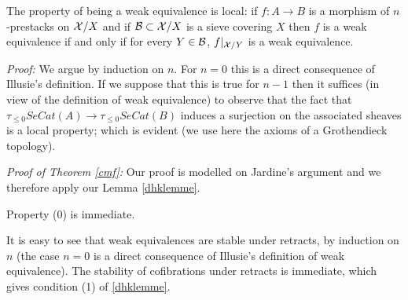 \begin{lemma}
\label{locale}
The property of being a weak equivalence is local: if
$f:A\rightarrow
B$ is a morphism of $n$-prestacks on ${\cal X} /X$ and if ${\cal B} \subset
{\cal X} /X$
is a sieve covering $X$
then $f$ is a weak equivalence if and only if for every $Y\in
{\cal B}$, $f|_{{\cal X} /Y}$ is a weak equivalence.
\end{lemma}
{\em Proof:}
We argue by induction on $n$. For $n=0$ this is a direct consequence
of Illusie's definition. If we suppose that this is true for $n-1$
then it suffices (in view of the definition of weak equivalence) to observe
that the fact that $\tau _{\leq 0}SeCat(A)\rightarrow \tau
_{\leq 0} SeCat(B)$ induces
a surjection on the associated sheaves is a local property;
which is evident
(we use here the axioms of a Grothendieck topology).
\eop



{\em Proof of Theorem \ref{cmf}:}
Our proof is modelled on Jardine's argument \cite{Jardine}
and we therefore apply
our Lemma \ref{dhklemme}.

Property (0) is immediate.

It is easy to see that weak equivalences are stable under
retracts, by induction on $n$ (the case $n=0$ is a direct
consequence of Illusie's definition of weak equivalence).
The stability of cofibrations under retracts is immediate, which gives
condition (1) of
\ref{dhklemme}.



